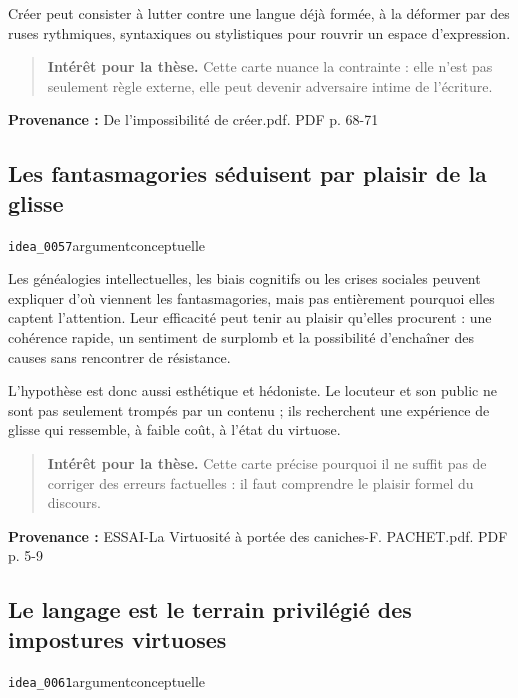 \documentclass[10pt,a4paper]{article}
\begin{document}
Créer peut consister à lutter contre une langue déjà formée, à la déformer par des ruses rythmiques, syntaxiques ou stylistiques pour rouvrir un espace d'expression.

\begin{quote}
\textbf{Intérêt pour la thèse.} Cette carte nuance la contrainte : elle n'est pas seulement règle externe, elle peut devenir adversaire intime de l'écriture.
\end{quote}
{\footnotesize\color{metadata}\textbf{Provenance :} De l'impossibilité de créer.pdf. PDF p. 68-71\par}

\subsection{Les fantasmagories séduisent par plaisir de la glisse}
{\small\color{metadata} \texttt{idea\_0057}\quad\textbullet\quad argument\quad\textbullet\quad conceptuelle\par}

Les généalogies intellectuelles, les biais cognitifs ou les crises sociales peuvent expliquer d'où viennent les fantasmagories, mais pas entièrement pourquoi elles captent l'attention. Leur efficacité peut tenir au plaisir qu'elles procurent : une cohérence rapide, un sentiment de surplomb et la possibilité d'enchaîner des causes sans rencontrer de résistance.

L'hypothèse est donc aussi esthétique et hédoniste. Le locuteur et son public ne sont pas seulement trompés par un contenu ; ils recherchent une expérience de glisse qui ressemble, à faible coût, à l'état du virtuose.

\begin{quote}
\textbf{Intérêt pour la thèse.} Cette carte précise pourquoi il ne suffit pas de corriger des erreurs factuelles : il faut comprendre le plaisir formel du discours.
\end{quote}
{\footnotesize\color{metadata}\textbf{Provenance :} ESSAI-La Virtuosité à portée des caniches-F. PACHET.pdf. PDF p. 5-9\par}

\subsection{Le langage est le terrain privilégié des impostures virtuoses}
{\small\color{metadata} \texttt{idea\_0061}\quad\textbullet\quad argument\quad\textbullet\quad conceptuelle\par}
\end{document}
